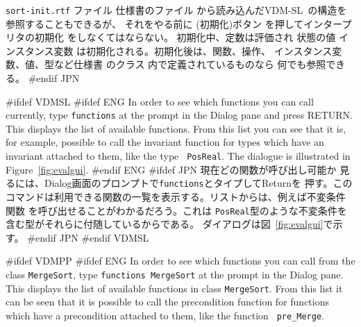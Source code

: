 \documentclass[\pformat,12pt]{article}
\newcommand{\vdmslpp}{VDM-SL}
\newcommand{\vdmslpp}{VDM++}
\newcommand{\aaa}{\tt }
\newcommand{\cmd}{\tt }
\newcommand{\guicmd}[1]{{\sf #1}}
\newcommand{\guicmd}[1]{{\gt #1}}
\begin{document}
{
{\tt sort-init.rtf} ファイル
}
{
仕様書のファイル
}
から読み込んだ\vdmslpp\ の構造を参照することもできるが、
それをやる前に  
(\guicmd{初期化})ボタン を押してインタープリタの初期化 をしなくてはならない。
初期化中、定数は評価され
{
状態の値
}
{
インスタンス変数
}
は初期化される。初期化後は、関数、操作、
インスタンス変数、値、型など仕様書
{
}
{
のクラス
}内で定義されているものなら
何でも参照できる。 
#endif JPN

#ifdef VDMSL 
#ifdef ENG
In order to see which functions
you can call 
currently, type {\tt functions} at the prompt in the \guicmd{Dialog}
pane and press RETURN. This displays the list of available
functions. From this list you can see that it is, for example,
possible to call the invariant function for
types which have an invariant attached to them, like the type {\aaa
  PosReal}. The dialogue is illustrated in Figure~\ref{fig:evalgui}.
#endif ENG
#ifdef JPN
現在どの関数が呼び出し可能か
見るには、\guicmd{Dialog}画面のプロンプトで{\tt functions}とタイプしてReturnを
押す。このコマンドは利用できる関数の一覧を表示する。リストからは、例えば不変条件
関数
を呼び出せることがわかるだろう。これは
{\aaa PosReal}型のような不変条件を含む型がそれらに付随しているからである。
ダイアログは図~\ref{fig:evalgui}で示す。
#endif JPN
#endif VDMSL

#ifdef VDMPP
#ifdef ENG
In order to see which functions you can call from the class
{\aaa MergeSort}, type {\cmd functions MergeSort} at the
prompt in the
\guicmd{Dialog} pane.  This displays the list of available functions
in class {\aaa MergeSort}.  From this list it can be seen that it is
possible to call the precondition
function for functions which
have a precondition attached to them, like the function {\aaa
  pre\_Merge}.
\end{document}
